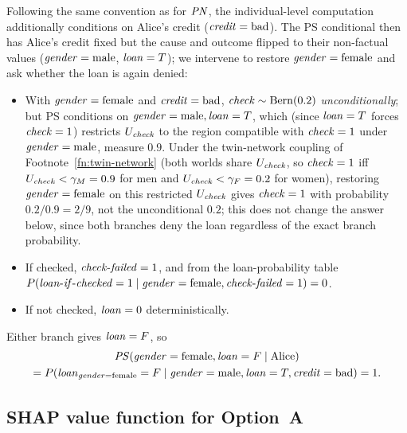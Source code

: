 Following the same convention as for $\mathit{PN}$, the individual-level computation
additionally conditions on Alice's credit ($\varname{credit}=\text{bad}$).
The PS conditional then has Alice's credit fixed but the cause and outcome flipped
to their non-factual values ($\varname{gender}=\text{male}$, $\varname{loan}=T$); we
intervene to restore $\varname{gender}=\text{female}$ and ask whether the loan is
again denied:
\begin{itemize}
\item With $\varname{gender}=\text{female}$ and $\varname{credit}=\text{bad}$,
$\varname{check}\sim\mathrm{Bern}(0.2)$ \emph{unconditionally}; but PS conditions on
$\varname{gender}=\text{male}, \varname{loan}=T$, which (since $\varname{loan}=T$
forces $\varname{check}=1$) restricts $U_{\varname{check}}$ to the region
compatible with $\varname{check}=1$ under $\varname{gender}=\text{male}$, measure
$0.9$. Under the twin-network coupling of Footnote~\ref{fn:twin-network} (both
worlds share $U_{\varname{check}}$, so $\varname{check}=1$ iff
$U_{\varname{check}}<\gamma_M=0.9$ for men and $U_{\varname{check}}<\gamma_F=0.2$
for women), restoring $\varname{gender}=\text{female}$ on this restricted
$U_{\varname{check}}$ gives $\varname{check}=1$ with probability
$0.2/0.9=2/9$, not the unconditional $0.2$; this does not change the answer below,
since both branches deny the loan regardless of the exact branch probability.
\item If checked, $\varname{check\text{-}failed}=1$, and from the loan-probability table
$P(\varname{loan\text{-}if\text{-}checked}=1\mid\varname{gender}=\text{female},\varname{check\text{-}failed}=1)=0$.
\item If not checked, $\varname{loan}=0$ deterministically.
\end{itemize}
Either branch gives $\varname{loan}=F$, so
\begin{multline*}
\ps(\varname{gender}=\text{female}, \varname{loan}=F \mid \text{Alice}) \\
= P(\varname{loan}_{\varname{gender}=\text{female}}=F \mid \varname{gender}=\text{male},
\varname{loan}=T, \varname{credit}=\text{bad}) = 1.
\end{multline*}

\subsection{SHAP value function for Option~A}\label{app:obcb_vS}

